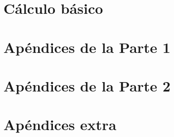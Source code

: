 \documentclass{book}
\begin{document}
  \chapter{Cálculo básico}
  
  \newpage
  \chapter{Apéndices de la Parte 1}
  
  \newpage
  
  \newpage
  
  \newpage
  
  \newpage
  \chapter{Apéndices de la Parte 2}


  \chapter{Apéndices extra}
  

  \nocite{*}
  
  
\end{document}
